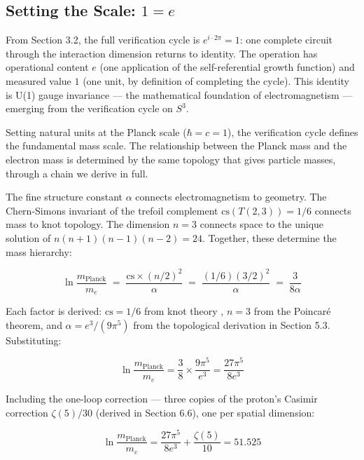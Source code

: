 
\subsection{Setting the Scale: $1 = e$}

From Section 3.2, the full verification cycle is $e^{i \cdot 2\pi} = 1$: one complete circuit through the interaction dimension returns to identity. The operation has operational content $e$ (one application of the self-referential growth function) and measured value $1$ (one unit, by definition of completing the cycle). This identity is U(1) gauge invariance --- the mathematical foundation of electromagnetism --- emerging from the verification cycle on $S^3$.

Setting natural units at the Planck scale ($\hbar = c = 1$), the verification cycle defines the fundamental mass scale. The relationship between the Planck mass and the electron mass is determined by the same topology that gives particle masses, through a chain we derive in full.

The fine structure constant $\alpha$ connects electromagnetism to geometry. The Chern-Simons invariant of the trefoil complement $\mathrm{cs}(T(2,3)) = 1/6$ connects mass to knot topology. The dimension $n = 3$ connects space to the unique solution of $n(n+1)(n-1)(n-2) = 24$. Together, these determine the mass hierarchy:

$$\ln \frac{m_{\text{Planck}}}{m_e} \;=\; \frac{\mathrm{cs} \times (n/2)^2}{\alpha} \;=\; \frac{(1/6)(3/2)^2}{\alpha} \;=\; \frac{3}{8\alpha}$$

Each factor is derived: $\mathrm{cs} = 1/6$ from knot theory \cite{kirkklassen1993}, $n = 3$ from the Poincar\'e theorem, and $\alpha = e^3/(9\pi^5)$ from the topological derivation in Section 5.3. Substituting:

$$\ln \frac{m_{\text{Planck}}}{m_e} = \frac{3}{8} \times \frac{9\pi^5}{e^3} = \frac{27\pi^5}{8e^3}$$

Including the one-loop correction --- three copies of the proton's Casimir correction $\zeta(5)/30$ (derived in Section 6.6), one per spatial dimension:

$$\ln \frac{m_{\text{Planck}}}{m_e} = \frac{27\pi^5}{8e^3} + \frac{\zeta(5)}{10} = 51.525$$

